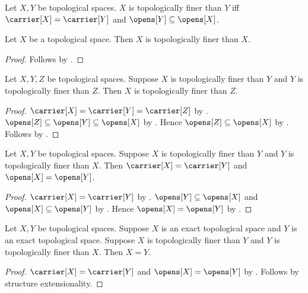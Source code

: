 \begin{definition}\label{topologically_finer}
    Let $X,Y$ be topological spaces.
    $X$ is topologically finer than $Y$ iff
        $\carrier[X]=\carrier[Y]$ and $\opens[Y]\subseteq\opens[X]$.
\end{definition}

\begin{proposition}\label{topologically_finer_reflexive}
    Let $X$ be a topological space.
    Then $X$ is topologically finer than $X$.
\end{proposition}
\begin{proof}
    Follows by .
\end{proof}

\begin{proposition}\label{topologically_finer_transitive}
    Let $X,Y,Z$ be topological spaces.
    Suppose $X$ is topologically finer than $Y$ and
        $Y$ is topologically finer than $Z$.
    Then $X$ is topologically finer than $Z$.
\end{proposition}
\begin{proof}
    $\carrier[X]=\carrier[Y]=\carrier[Z]$ by
        .
    $\opens[Z]\subseteq\opens[Y]\subseteq\opens[X]$ by
        .
    Hence $\opens[Z]\subseteq\opens[X]$ by
        .
    Follows by .
\end{proof}

\begin{proposition}\label{topologically_finer_antisymmetric}
    Let $X,Y$ be topological spaces.
    Suppose $X$ is topologically finer than $Y$ and
        $Y$ is topologically finer than $X$.
    Then $\carrier[X]=\carrier[Y]$ and $\opens[X]=\opens[Y]$.
\end{proposition}
\begin{proof}
    $\carrier[X]=\carrier[Y]$ by .
    $\opens[Y]\subseteq\opens[X]$ and
        $\opens[X]\subseteq\opens[Y]$ by .
    Hence $\opens[X]=\opens[Y]$ by .
\end{proof}

\begin{corollary}\label{exact_topologically_finer_antisymmetric}
    Let $X,Y$ be topological spaces.
    Suppose $X$ is an exact topological space and
        $Y$ is an exact topological space.
    Suppose $X$ is topologically finer than $Y$ and
        $Y$ is topologically finer than $X$.
    Then $X=Y$.
\end{corollary}
\begin{proof}
    $\carrier[X]=\carrier[Y]$ and $\opens[X]=\opens[Y]$ by
        .
    Follows by structure extensionality.
\end{proof}

